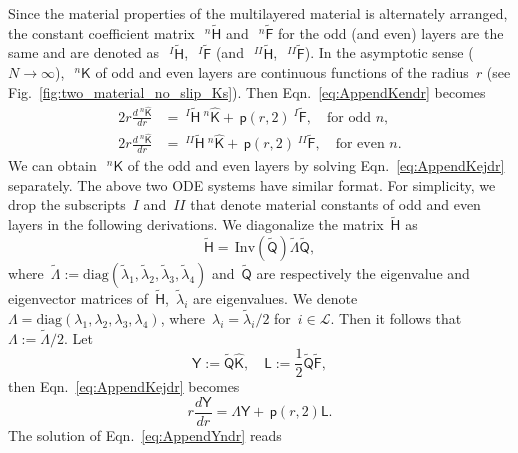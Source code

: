\documentclass[preprint,10pt,times]{elsarticle}
\numberwithin{equation}{section}
\renewcommand{\u}[1]{\boldsymbol{#1}}
\newcommand{\usf}[1]{\u{\mathsf #1}}
\newcommand{\pr}[1]{\left( #1 \right)}
\newcommand{\p}{\,\mathsf{p}}
\newcommand{\Inv}{\,\mathrm{Inv}}
\renewcommand{\>}{$\Rightarrow$}
\begin{document}
Since the material properties of the multilayered material is alternately arranged, the constant coefficient matrix~$~^{n}\tilde{\usf{H}}$ and~$~^{n}\tilde{\usf{F}}$ for the odd (and even) layers are the same and are denoted as~$~^{I}\tilde{\usf{H}}$,~$~^{I}\tilde{\usf{F}}$ (and~$~^{II}\tilde{\usf{H}}$,~$~^{II}\tilde{\usf{F}}$). In the asymptotic sense ($N \to \infty$),~$~^{n}{\usf{K}}$ of odd and even layers are continuous functions of the radius~$r$ (see Fig.~\ref{fig:two_material_no_slip_Ks}). Then Eqn.~\eqref{eq:AppendKendr} becomes
\begin{subequations}
\begin{align}
	2 r \frac{d~^{n}{\hat{\usf{K}}}}{dr} & = ~^{I}\tilde{\usf{H}} ~^{n}{\hat{\usf{K}}} + \p\pr{r,2} ~^{I}\tilde{\usf{F}}, \quad \text{for odd~$n$}, \\
	2 r \frac{d~^{n}{\hat{\usf{K}}}}{dr} & = ~^{II}\tilde{\usf{H}} ~^{n}{\hat{\usf{K}}} + \p\pr{r,2} ~^{II}\tilde{\usf{F}}, \quad \text{for even~$n$}.
\end{align}
\label{eq:AppendKejdr}
\end{subequations}
We can obtain~$~^{n}{\usf{K}}$ of the odd and even layers by solving Eqn.~\eqref{eq:AppendKejdr} separately. The above two ODE systems have similar format. For simplicity, we drop the subscripts~$I$ and~$II$ that denote material constants of odd and even layers in the following derivations. We diagonalize the matrix~$\tilde{\usf{H}}$ as
\begin{equation}
    \tilde{\usf{H}} = \Inv\pr{\tilde{\usf{Q}}} \tilde{\usf{\Lambda}} \tilde{\usf{Q}},
\end{equation}
where~$\tilde{\usf{\Lambda}} := \text{diag}(\tilde{\lambda}_1,\tilde{\lambda}_2,\tilde{\lambda}_3,\tilde{\lambda}_4)$ and~$\tilde{\usf{Q}}$ are respectively the eigenvalue and eigenvector matrices of~$\tilde{\usf{H}}$,~$\tilde{\lambda}_i$ are eigenvalues. We denote~$\usf{\Lambda}= \text{diag}(\lambda_1,\lambda_2,\lambda_3,\lambda_4)$, where~$\lambda_i = \tilde{\lambda}_i/2$ for~$i \in \mathcal{L}$. Then it follows that~$\usf{\Lambda} := \tilde{\usf{\Lambda}}/2$.
Let
\begin{equation}
	\usf{Y} := \tilde{\usf{Q}} \hat{\usf{K}}, \quad \usf{L} := \frac{1}{2}\tilde{\usf{Q}} \tilde{\usf{F}},
\end{equation}
then Eqn.~\eqref{eq:AppendKejdr} becomes
\begin{equation}
	r \frac{d\usf{Y}}{dr} = \usf{\Lambda} \usf{Y} + \p\pr{r,2} \usf{L}.
	\label{eq:AppendYndr}
\end{equation}
The solution of Eqn.~\eqref{eq:AppendYndr} reads
\end{document}
